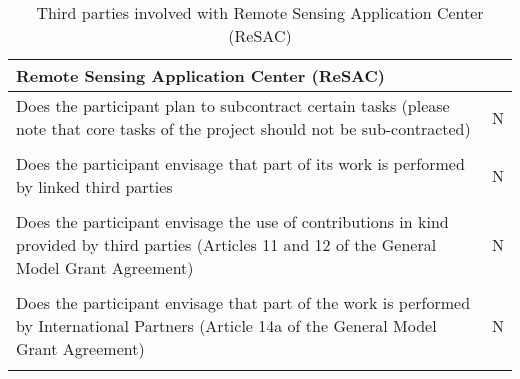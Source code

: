 \begin{table}[H]
	\centering
	\begin{tabular}{|p{10cm}|p{4cm}|}
		\hline
		
		\multicolumn{2}{|p{14cm}|}{\textbf{Remote Sensing Application Center (ReSAC)}}\\
		
		\hline
		
		Does the participant plan to subcontract certain tasks (please note that core tasks of the project should not be sub-contracted) & N\\
		
		\hline
		
		\multicolumn{2}{|p{14cm}|}{}\\
		
		\hline
		
		Does the participant envisage that part of its work is performed by linked third parties & N\\
		
		\hline
		
		\multicolumn{2}{|p{14cm}|}{}\\
		
		\hline
		
		Does the participant envisage the use of contributions in kind provided by third parties (Articles 11 and 12 of the General Model Grant Agreement) & N\\
		
		\hline
		
		\multicolumn{2}{|p{14cm}|}{}\\
		
		\hline
		
		Does the participant envisage that part of the work is performed by International Partners (Article 14a of the General Model Grant Agreement) & N\\
		
		\hline
		
		\multicolumn{2}{|p{14cm}|}{}\\
		
		\hline
	\end{tabular}
	\caption{Third parties involved with Remote Sensing Application Center (ReSAC)}
\end{table}



